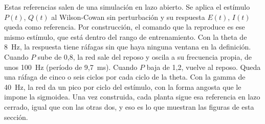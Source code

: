 \documentclass[10pt,a4paper]{article}
\begin{document}
Estas referencias salen de una simulación en lazo abierto. Se aplica el estímulo $P(t)$, $Q(t)$ al Wilson-Cowan sin perturbación y su respuesta $E(t)$, $I(t)$ queda como referencia. Por construcción, el comando que la reproduce es ese mismo estímulo, que está dentro del rango de entrenamiento. Con la theta de 8~Hz, la respuesta tiene ráfagas sin que haya ninguna ventana en la definición. Cuando $P$ sube de 0,8, la red sale del reposo y oscila a su frecuencia propia, de unos 100~Hz (período de 9,7~ms). Cuando $P$ baja de 1,2, vuelve al reposo. Queda una ráfaga de cinco o seis ciclos por cada ciclo de la theta. Con la gamma de 40~Hz, la red da un pico por ciclo del estímulo, con la forma angosta que le impone la sigmoidea. Una vez construida, cada planta sigue esa referencia en lazo cerrado, igual que con las otras dos, y eso es lo que muestran las figuras de esta sección.
\end{document}
